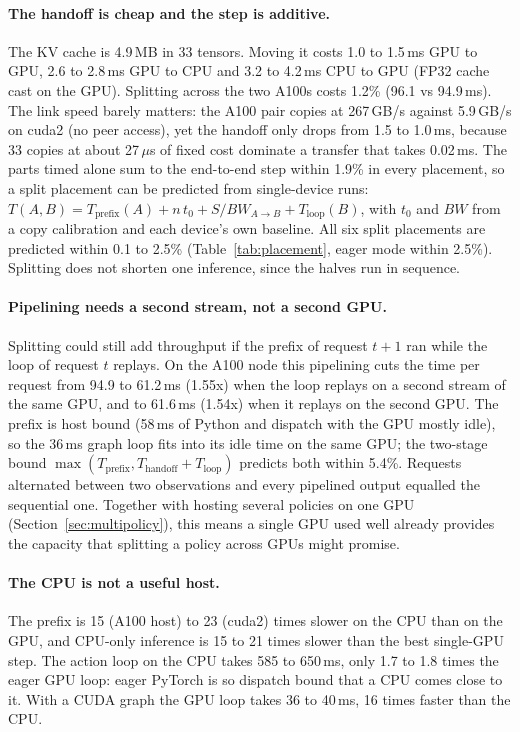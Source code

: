 \paragraph{The handoff is cheap and the step is additive.} The KV cache is 4.9\,MB in 33
tensors. Moving it costs 1.0 to 1.5\,ms GPU to GPU, 2.6 to 2.8\,ms GPU to CPU and 3.2 to
4.2\,ms CPU to GPU (FP32 cache cast on the GPU). Splitting across the two A100s costs 1.2\%
(96.1 vs 94.9\,ms). The link speed barely matters: the A100 pair copies at 267\,GB/s against
5.9\,GB/s on cuda2 (no peer access), yet the handoff only drops from 1.5 to 1.0\,ms, because
33 copies at about 27\,$\mu$s of fixed cost dominate a transfer that takes 0.02\,ms. The parts
timed alone sum to the end-to-end step within 1.9\% in every placement, so a split placement
can be predicted from single-device runs:
$T(A,B) = T_\mathrm{prefix}(A) + n\,t_0 + S/\mathit{BW}_{A\to B} + T_\mathrm{loop}(B)$, with
$t_0$ and $\mathit{BW}$ from a copy calibration and each device's own baseline. All six split
placements are predicted within 0.1 to 2.5\% (Table~\ref{tab:placement}, eager mode within
2.5\%). Splitting does not shorten one inference, since the halves run in sequence.

\paragraph{Pipelining needs a second stream, not a second GPU.} Splitting could still add
throughput if the prefix of request $t{+}1$ ran while the loop of request $t$ replays. On the
A100 node this pipelining cuts the time per request from 94.9 to 61.2\,ms (1.55x) when the
loop replays on a second stream of the same GPU, and to 61.6\,ms (1.54x) when it replays on
the second GPU. The prefix is host bound (58\,ms of Python and dispatch with the GPU mostly
idle), so the 36\,ms graph loop fits into its idle time on the same GPU; the two-stage bound
$\max(T_\mathrm{prefix}, T_\mathrm{handoff} + T_\mathrm{loop})$ predicts both within 5.4\%.
Requests alternated between two observations and every pipelined output equalled the
sequential one. Together with hosting several policies on one GPU
(Section~\ref{sec:multipolicy}), this means a single GPU used well already provides the
capacity that splitting a policy across GPUs might promise.

\paragraph{The CPU is not a useful host.} The prefix is 15 (A100 host) to 23 (cuda2) times
slower on the CPU than on the GPU, and CPU-only inference is 15 to 21 times slower than the
best single-GPU step. The action loop on the CPU takes 585 to 650\,ms, only 1.7 to 1.8 times
the eager GPU loop: eager PyTorch is so dispatch bound that a CPU comes close to it. With a
CUDA graph the GPU loop takes 36 to 40\,ms, 16 times faster than the CPU.

